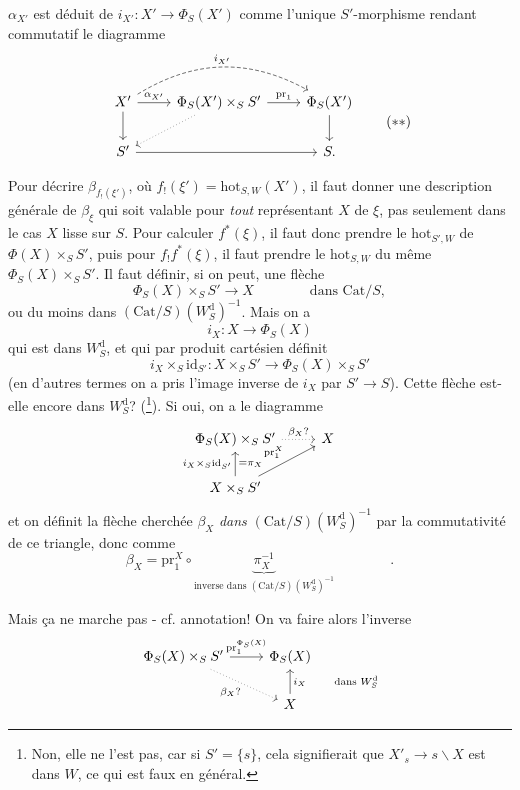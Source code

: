 \documentclass[11pt]{article}
\newcommand{\printedpage}[1]{\marginpar{\footnotesize p.~#1}}
\newcommand{\msp}[1]{\marginpar{\footnotesize [#1]}}
\newcommand{\hot}{\mathrm{hot}}
\newcommand{\Cat}{\mathrm{Cat}}
\newcommand{\id}{\mathrm{id}}
\newcommand{\pr}{\mathrm{pr}}
\newcommand{\Wd}{W^{\mathrm{d}}}
\begin{document}
$\alpha_{X'}$ est déduit de $i_{X'} : X'\longrightarrow\Phi_S(X')$ comme l'unique $S'$-morphisme rendant commutatif le diagramme
\[
\begin{tikzcd}
X' \arrow[r, "{\alpha_{X'}}"] \arrow[d] \arrow[rr, bend left, dashed, "{i_{X'}}"] & \Phi_S(X')\times_S S' \arrow[r, "\pr_1"] \arrow[dl, dotted] & \Phi_S(X') \arrow[d] \\ %
S' \arrow[rr] & & S.
\end{tikzcd}
\tag*{$(**)$}
\]

Pour décrire $\beta_{f_!(\xi')}$, où $f_!(\xi') = \hot_{S,W}(X')$, il faut donner une description générale de $\beta_\xi$ qui soit valable pour \textit{tout} représentant $X$ de $\xi$, pas seulement dans le cas $X$ lisse sur $S$. Pour calculer $f^*(\xi)$, il faut donc prendre le $\hot_{S',W}$ de $\Phi(X)\times_S S'$, puis pour $f_!f^*(\xi)$, il \msp{page 142}faut prendre le $\hot_{S,W}$ du même $\Phi_S(X)\times_S S'$. Il faut définir, si on peut, une flèche
\[
\Phi_S(X)\times_S S' \longrightarrow X \qquad\qquad \text{dans } \Cat/S,
\]
ou du moins dans $(\Cat/S)(\Wd_S)^{-1}$. Mais on a
\[
i_X : X \longrightarrow \Phi_S(X)
\]
qui est dans $\Wd_S$, et qui par produit cartésien définit
\[
i_X\times_S\id_{S'} : X\times_S S' \longrightarrow \Phi_S(X)\times_S S'
\]
(en d'autres termes on a pris l'image inverse de $i_X$ par $S'\longrightarrow S$). Cette flèche est-elle encore dans $\Wd_S$? (\footnote[69]{Non, elle ne l'est pas, car si $S'=\{s\}$, cela signifierait que $X'_s\longrightarrow s\backslash X$ est dans $W$, ce qui est faux en général.}). Si oui, on a le diagramme
\printedpage{87}
\[
\begin{tikzcd}
\Phi_S(X)\times_S S' \arrow[r, dotted, "\beta_X ?"] & X \\
X\times_S S' \arrow[u, "{i_X\times_S\id_{S'}}", "{=\pi_X}"'] \arrow[ur, "\pr_1^X"] &
\end{tikzcd}
\]
et on définit la flèche cherchée $\beta_X$ \textit{dans} $(\Cat/S)(\Wd_S)^{-1}$ par la commutativité de ce triangle, donc comme
\[
\beta_X = \pr_1^X\circ\underbrace{\pi_X^{-1}}_{\text{inverse dans }(\Cat/S)(\Wd_S)^{-1}} \qquad\qquad .
\]

\leavevmode\msp{page 143}Mais ça ne marche pas - cf. annotation! On va faire alors l'inverse
\[
\begin{tikzcd}
\Phi_S(X)\times_S S' \arrow[r, "\pr_1^{\Phi_S(X)}"] \arrow[dr, dotted, "\beta_X ?"'] & \Phi_S(X) \\
 & X \arrow[u, "{i_X \qquad \text{dans } \Wd_S}"']
\end{tikzcd}
\]
\end{document}
